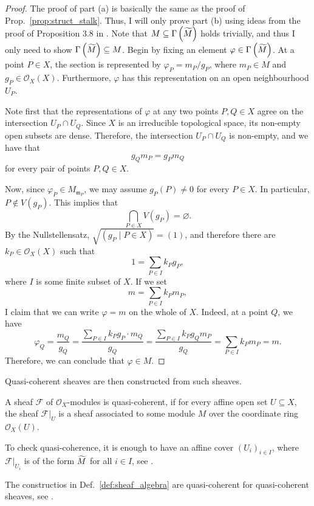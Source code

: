 \begin{proof}
  The proof of part (a) is basically the same as the proof of
  Prop.~\ref{prop:struct_stalk}. Thus, I will only prove part (b) using
  ideas from the proof of Proposition 3.8 in \cite{gathmann_new}. Note
  that $M\subseteq\Gamma\left(\widetilde{M}\right)$ holds trivially, and thus I
  only need to show $\Gamma\left(\widetilde{M}\right)\subseteq M$.
  Begin by fixing an element $\varphi\in\Gamma\left(\widetilde{M}\right)$.
  At a point $P\in X$, the section is represented by
  $\varphi_P=m_P/g_P$, where $m_P\in M$ and $g_P\in\mathscr{O}_X(X)$.
  Furthermore, $\varphi$ has this representation on an open neighbourhood $U_P$.
  
  Note first that the representations of $\varphi$ at
  any two points $P,Q\in X$ agree on the intersection
  $U_P\cap U_Q$. Since $X$ is an irreducible topological space,
  its non-empty open subsets are dense. Therefore, the
  intersection $U_P\cap U_Q$ is non-empty, and we have that
  \[g_Qm_P=g_Pm_Q\]
  for every pair of points $P,Q\in X$.

  Now, since $\varphi_P\in M_{\mathfrak{m}_P}$, we may assume $g_P(P)\neq 0$ for every $P\in X$.
  In particular, $P\not\in V(g_P)$. This implies that
  \[
    \bigcap_{P\in X}V(g_P)=\varnothing.
  \]
  By the Nullstellensatz, $\sqrt{(g_P\mid P\in X)}=(1)$, and therefore
  there are $k_P\in\mathscr{O}_X(X)$ such that
  \[1=\sum_{P\in I}k_Pg_P,\]
  where $I$ is some finite subset of $X$.
  If we set
  \[m=\sum_{P\in I}k_Pm_P,\]
  I claim that we can write $\varphi=m$ on the whole of $X$.
  Indeed, at a point $Q$, we have
  \[\varphi_Q=\frac{m_Q}{g_Q}=\frac{\sum_{P\in I}k_Pg_P\cdot m_Q}{g_Q}=\frac{\sum_{P\in I}k_Pg_Qm_P}{g_Q}=\sum_{P\in I}k_Pm_P=m.\]
  Therefore, we can conclude that $\varphi\in M$.
\end{proof}
Quasi-coherent sheaves are then constructed from such sheaves.
\begin{defin}
  A sheaf $\mathscr{F}$ of $\mathscr{O}_{X}$-modules is quasi-coherent, if
  for every affine open set $U\subseteq X$, the sheaf $\mathscr{F}\vert_{U}$
  is a sheaf associated to some module $M$ over the coordinate ring
  $\mathscr{O}_{X}(U)$.
\end{defin}
\begin{rem}
  To check quasi-coherence, it is enough to have an affine cover
  $(U_{i})_{i\in I}$, where $\mathscr{F}\vert_{U_{i}}$ is of the form $\widetilde{M}$ for
  all $i\in I$, see \cite{gathmann}.
\end{rem}
\begin{rem}
  The constructios in Def.~\ref{def:sheaf_algebra} are quasi-coherent
  for quasi-coherent sheaves, see \cite{gathmann}.
\end{rem}
